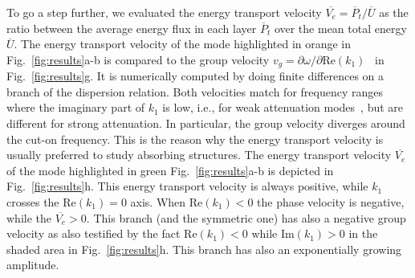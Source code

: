     To go a step further, we evaluated the energy transport velocity $\overline{V_e} = \overline{P}_t / \overline U$ as the ratio between the average energy flux in each layer  $\overline{P}_t$ over the mean total energy $\overline U$. The energy transport velocity of the mode highlighted in orange in Fig.~\ref{fig:results}a-b is compared to the group velocity $v_g=\partial \omega/\partial \textrm{Re}\left(k_1 \right)$~\cite{brillouin1946} in Fig.~\ref{fig:results}g. It is numerically computed by doing finite differences on a branch of the dispersion relation. Both velocities match for frequency ranges where the imaginary part of $ k_1$ is low, i.e., for weak attenuation modes~\cite{bernard2001,simonetti2005,castaings2003,carcione1996}, but are different for strong attenuation. In particular, the group velocity diverges around the cut-on frequency. This is the reason why the energy transport velocity is usually preferred to study absorbing structures. The energy transport velocity $\overline{V_e}$ of the mode highlighted in green Fig.~\ref{fig:results}a-b is depicted in Fig.~\ref{fig:results}h. This energy transport velocity is always positive, while $ k_1$ crosses the $\textrm{Re}\left(k_1 \right)=0$ axis. When 
    $\textrm{Re}\left(k_1 \right)<0$ the phase velocity is negative, while the $\overline{V_e}>0$. This branch (and the symmetric one) has also a negative group velocity as also testified by the fact $\textrm{Re}\left(k_1 \right)<0$ while $\textrm{Im}\left(k_1 \right)>0$  in the shaded area in Fig.~\ref{fig:results}h. This branch has also an exponentially growing amplitude.
    

